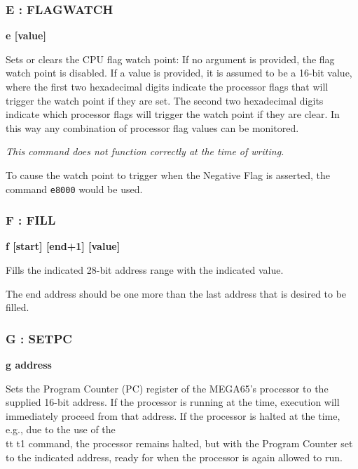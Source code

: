\subsubsection{E : FLAGWATCH}
\begin{description}[leftmargin=2cm,style=nextline]
\item [Format:] {\bf e [value]}
\item [Usage:] 
  Sets or clears the CPU flag watch point: If no argument is provided, the
  flag watch point is disabled. If a value is provided, it is assumed to be
  a 16-bit value, where the first two hexadecimal digits indicate the processor
  flags that will trigger the watch point if they are set. The second two
  hexadecimal digits indicate which processor flags will trigger the watch point
  if they are clear.  In this way any combination of processor flag values can
  be monitored.

  {\em This command does not function correctly at the time of writing.}
  
\item [Example:]

  To cause the watch point to trigger when the Negative Flag is asserted, the
  command {\tt e8000} would be used.  
  
\end{description}

\subsubsection{F : FILL}
\begin{description}[leftmargin=2cm,style=nextline]
\item [Format:] {\bf f [start] [end+1] [value] }
\item [Usage:] Fills the indicated 28-bit address range with
  the indicated value. 
\item [Remarks:]
  The end address should be one more than the last address
  that is desired to be filled.

\end{description}

\subsubsection{G : SETPC}
\begin{description}[leftmargin=2cm,style=nextline]
\item [Format:] {\bf g address}
\item [Usage:] Sets the Program Counter (PC) register of the MEGA65's processor
  to the supplied 16-bit address.  If the processor is running at the time, execution
  will immediately proceed from that address. If the processor is halted at the time,
  e.g., due to the use of the {\\tt t1} command, the processor remains halted, but with
  the Program Counter set to the indicated address, ready for when the processor is
  again allowed to run.

\end{description}


